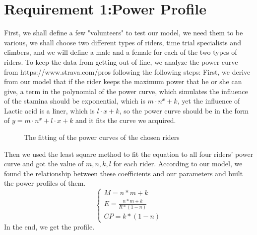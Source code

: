 \documentclass[12pt]{article}
\begin{document}
\section{Requirement 1:Power Profile}
First, we shall define a few "volunteers" to test our model, we need them to be various, we shall choose two different types of riders, time trial
specialists and climbers, and we will define a male and a female for each of the two types of riders. %
To keep the data from getting out of line, we analyze the power curve
from https://www.strava.com/pros following the following steps:
First, we derive from our model that if the rider keeps the maximum power that he or she can give, a term in the polynomial of the power curve,  which simulates the influence of the stamina should be exponential,
which is $m\cdot n^x+k$, yet the influence of Lactic acid is a liner, which is $l\cdot x+k$, so the power curve should be in the form of $y=m\cdot n^x+l\cdot x+k$
and it fits the curve we acquired.


\begin{figure}[H]
    \centering

    \caption{The fitting of the power curves of the chosen riders}
\end{figure}
Then we used the least square method to fit the equation to all four riders' power curve and  %
got the value of $m,n,k,l$ for each rider. According to our model, we found the relationship between these
coefficients and our parameters and built the power profiles of them.
\begin{equation}
    \left\{
    \begin{array}{c}
        M=n*m+k                 \\
        E=\frac{n*m+k}{R*(1-n)} \\
        CP=k*(1-n)
    \end{array}
    \right.
\end{equation}
In the end, we get the profile.
\end{document}
